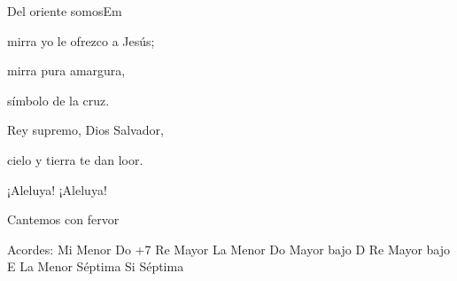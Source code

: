 \documentclass[12pt, spanish]{book}
\begin{document}
\begin{song}{Del oriente somos}{Em}
\begin{SBOpGroup}
            mirra yo le ofrezco a Jesús;

            mirra pura amargura,

            símbolo de la cruz.
        \end{SBOpGroup}

        \begin{SBOpGroup}
            Rey supremo, Dios Salvador,

            cielo y tierra te dan loor.

            ¡Aleluya! ¡Aleluya!

            Cantemos con fervor
        \end{SBOpGroup}

        \ifChordBk
        \begin{SBOpGroup}
            Acordes:\break
            \upchord{\Em}\qquad Mi Menor \hfill
            \upchord{\CMaj}\qquad Do +7 \hfill\null\break
            \upchord{\D}\qquad Re Mayor \hfill
            \upchord{\Am}\qquad La Menor \hfill\null\break
            \upchord{\CD}\qquad Do Mayor bajo D \hfill\null\break
            \upchord{\DE}\qquad Re Mayor bajo E \hfill\null\break
            \upchord{\Amseven}\qquad La Menor S\'eptima \hfill
            \upchord{\Bseven}\qquad Si S\'eptima \hfill\null\break
        \end{SBOpGroup}
        \fi
    \end{song}
\end{document}
